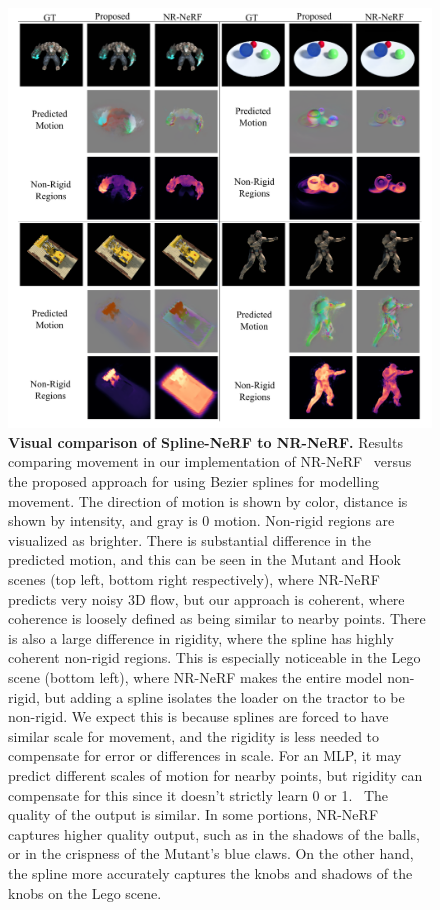 \begin{figure}
    \includegraphics[width=\textwidth]{compare}
    \caption{
        \label{fig:qual_cmp}
        \textbf{Visual comparison of Spline-NeRF to NR-NeRF.}
        Results comparing movement in our implementation of NR-NeRF~\cite{tretschk2021nonrigid} versus the proposed approach for using Bezier splines for modelling movement. The direction of motion is shown by color, distance is shown by intensity, and gray is 0 motion. Non-rigid regions are visualized as brighter. There is substantial difference in the predicted motion, and this can be seen in the Mutant and Hook scenes (top left, bottom right respectively), where NR-NeRF predicts very noisy 3D flow, but our approach is coherent, where coherence is loosely defined as being similar to nearby points. There is also a large difference in rigidity, where the spline has highly coherent non-rigid regions. This is especially noticeable in the Lego scene (bottom left), where NR-NeRF makes the entire model non-rigid, but adding a spline isolates the loader on the tractor to be non-rigid. We expect this is because splines are forced to have similar scale for movement, and the rigidity is less needed to compensate for error or differences in scale. For an MLP, it may predict different scales of motion for nearby points, but rigidity can compensate for this since it doesn't strictly learn 0 or 1.
        \
        The quality of the output is similar. In some portions, NR-NeRF captures higher quality output, such as in the shadows of the balls, or in the crispness of the Mutant's blue claws. On the other hand, the spline more accurately captures the knobs and shadows of the knobs on the Lego scene.
    }
\end{figure}

